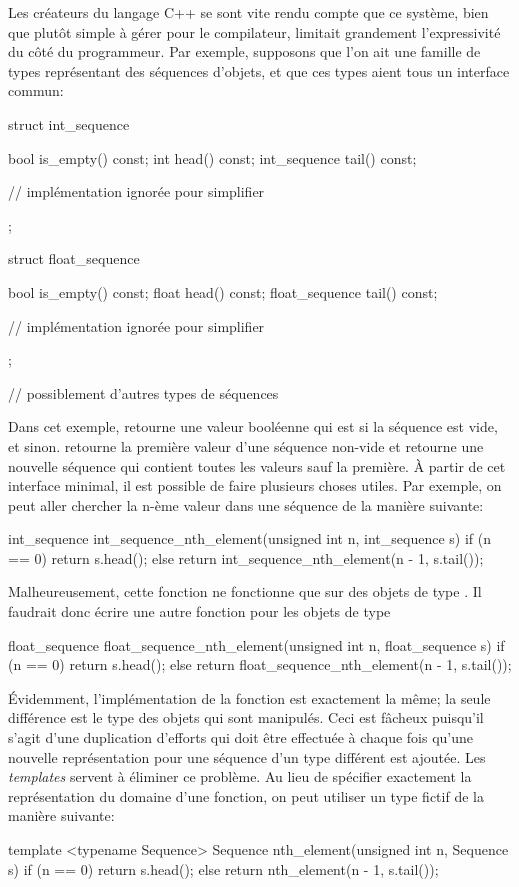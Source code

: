 Les créateurs du langage C++ se sont vite rendu compte que ce système,
bien que plutôt simple à gérer pour le compilateur, limitait grandement
l'expressivité du côté du programmeur. Par exemple, supposons que l'on
ait une famille de types représentant des séquences d'objets, et que ces
types aient tous un interface commun:

\begin{cpp}
    struct int_sequence {
        bool is_empty() const;
        int head() const;
        int_sequence tail() const;

        // implémentation ignorée pour simplifier
    };

    struct float_sequence {
        bool is_empty() const;
        float head() const;
        float_sequence tail() const;

        // implémentation ignorée pour simplifier
    };

    // possiblement d'autres types de séquences
\end{cpp}

Dans cet exemple,  retourne une valeur booléenne qui est 
si la séquence est vide, et  sinon.  retourne la première
valeur d'une séquence non-vide et  retourne une nouvelle séquence
qui contient toutes les valeurs sauf la première. À partir de cet interface
minimal, il est possible de faire plusieurs choses utiles. Par exemple, on
peut aller chercher la n-ème valeur dans une séquence de la manière suivante:
\begin{cpp}
    int_sequence int_sequence_nth_element(unsigned int n, int_sequence s) {
        if (n == 0) return s.head();
        else        return int_sequence_nth_element(n - 1, s.tail());
    }
\end{cpp}

Malheureusement, cette fonction ne fonctionne que sur des objets de type
. Il faudrait donc écrire une autre fonction pour les
objets de type 
\begin{cpp}
    float_sequence float_sequence_nth_element(unsigned int n, float_sequence s) {
        if (n == 0) return s.head();
        else        return float_sequence_nth_element(n - 1, s.tail());
    }
\end{cpp}

Évidemment, l'implémentation de la fonction est exactement la même; la seule
différence est le type des objets qui sont manipulés. Ceci est fâcheux puisqu'il
s'agit d'une duplication d'efforts qui doit être effectuée à chaque fois qu'une
nouvelle représentation pour une séquence d'un type différent est ajoutée. Les
\textit{templates} servent à éliminer ce problème. Au lieu de spécifier exactement
la représentation du domaine d'une fonction, on peut utiliser un type fictif de la
manière suivante:
\begin{cpp}
    template <typename Sequence>
    Sequence nth_element(unsigned int n, Sequence s) {
        if (n == 0) return s.head();
        else        return nth_element(n - 1, s.tail());
    }
\end{cpp}

